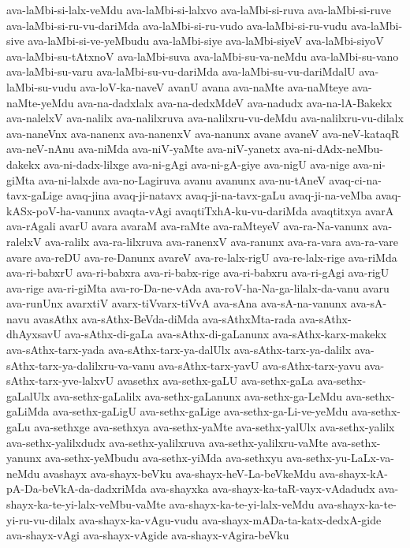 {ava-laMbi-si-lalx-veMdu
ava-laMbi-si-lalxvo
ava-laMbi-si-ruva
ava-laMbi-si-ruve
ava-laMbi-si-ru-vu-dariMda
ava-laMbi-si-ru-vudo
ava-laMbi-si-ru-vudu
ava-laMbi-sive
ava-laMbi-si-ve-yeMbudu
ava-laMbi-siye
ava-laMbi-siyeV
ava-laMbi-siyoV
ava-laMbi-su-tAtxnoV
ava-laMbi-suva
ava-laMbi-su-va-neMdu
ava-laMbi-su-vano
ava-laMbi-su-varu
ava-laMbi-su-vu-dariMda
ava-laMbi-su-vu-dariMdalU
ava-laMbi-su-vudu
ava-loV-ka-naveV
avanU
avana
ava-naMte
ava-naMteye
ava-naMte-yeMdu
ava-na-dadxlalx
ava-na-dedxMdeV
ava-nadudx
ava-na-lA-Bakekx
ava-nalelxV
ava-nalilx
ava-nalilxruva
ava-nalilxru-vu-deMdu
ava-nalilxru-vu-dilalx
ava-naneVnx
ava-nanenx
ava-nanenxV
ava-nanunx
avane
avaneV
ava-neV-kataqR
ava-neV-nAnu
ava-niMda
ava-niV-yaMte
ava-niV-yanetx
ava-ni-dAdx-neMbu-dakekx
ava-ni-dadx-lilxge
ava-ni-gAgi
ava-ni-gA-giye
ava-nigU
ava-nige
ava-ni-giMta
ava-ni-lalxde
ava-no-Lagiruva
avanu
avanunx
ava-nu-tAneV
avaq-ci-na-tavx-gaLige
avaq-jina
avaq-ji-natavx
avaq-ji-na-tavx-gaLu
avaq-ji-na-veMba
avaq-kASx-poV-ha-vanunx
avaqta-vAgi
avaqtiTxhA-ku-vu-dariMda
avaqtitxya
avarA
ava-rAgali
avarU
avara
avaraM
ava-raMte
ava-raMteyeV
ava-ra-Na-vanunx
ava-ralelxV
ava-ralilx
ava-ra-lilxruva
ava-ranenxV
ava-ranunx
ava-ra-vara
ava-ra-vare
avare
ava-reDU
ava-re-Danunx
avareV
ava-re-lalx-rigU
ava-re-lalx-rige
ava-riMda
ava-ri-babxrU
ava-ri-babxra
ava-ri-babx-rige
ava-ri-babxru
ava-ri-gAgi
ava-rigU
ava-rige
ava-ri-giMta
ava-ro-Da-ne-vAda
ava-roV-ha-Na-ga-lilalx-da-vanu
avaru
ava-runUnx
avarxtiV
avarx-tiVvarx-tiVvA
ava-sAna
ava-sA-na-vanunx
ava-sA-navu
avasAthx
ava-sAthx-BeVda-diMda
ava-sAthxMta-rada
ava-sAthx-dhAyxsavU
ava-sAthx-di-gaLa
ava-sAthx-di-gaLanunx
ava-sAthx-karx-makekx
ava-sAthx-tarx-yada
ava-sAthx-tarx-ya-dalUlx
ava-sAthx-tarx-ya-dalilx
ava-sAthx-tarx-ya-dalilxru-va-vanu
ava-sAthx-tarx-yavU
ava-sAthx-tarx-yavu
ava-sAthx-tarx-yve-lalxvU
avasethx
ava-sethx-gaLU
ava-sethx-gaLa
ava-sethx-gaLalUlx
ava-sethx-gaLalilx
ava-sethx-gaLanunx
ava-sethx-ga-LeMdu
ava-sethx-gaLiMda
ava-sethx-gaLigU
ava-sethx-gaLige
ava-sethx-ga-Li-ve-yeMdu
ava-sethx-gaLu
ava-sethxge
ava-sethxya
ava-sethx-yaMte
ava-sethx-yalUlx
ava-sethx-yalilx
ava-sethx-yalilxdudx
ava-sethx-yalilxruva
ava-sethx-yalilxru-vaMte
ava-sethx-yanunx
ava-sethx-yeMbudu
ava-sethx-yiMda
ava-sethxyu
ava-sethx-yu-LaLx-va-neMdu
avashayx
ava-shayx-beVku
ava-shayx-heV-La-beVkeMdu
ava-shayx-kA-pA-Da-beVkA-da-dadxriMda
ava-shayxka
ava-shayx-ka-taR-vayx-vAdadudx
ava-shayx-ka-te-yi-lalx-veMbu-vaMte
ava-shayx-ka-te-yi-lalx-veMdu
ava-shayx-ka-te-yi-ru-vu-dilalx
ava-shayx-ka-vAgu-vudu
ava-shayx-mADa-ta-katx-dedxA-gide
ava-shayx-vAgi
ava-shayx-vAgide
ava-shayx-vAgira-beVku
}

